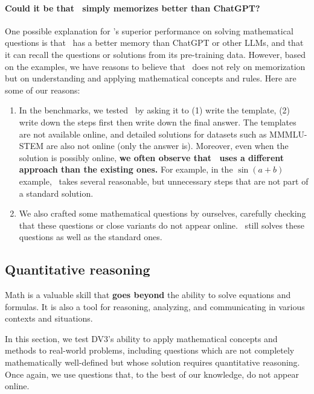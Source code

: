 \paragraph{Could it be that \DV \ simply memorizes better than ChatGPT?} One possible explanation for \DV's superior performance on solving mathematical questions is that \DV \ has a better memory than ChatGPT or other LLMs, and that it can recall the questions or solutions from its pre-training data. However, based on the examples, we have reasons to believe that \DV \ does not rely on memorization but on understanding and applying mathematical concepts and rules. Here are some of our reasons:
\begin{enumerate}
    \item In the benchmarks, we tested \DV \ by asking it to (1) write the template, (2) write down the steps first then write down the final answer. The templates are not available online, and detailed solutions for datasets such as MMMLU-STEM are also not online (only the answer is). Moreover, even when the solution is possibly online, \textbf{we often observe that \DV \ uses a different approach than the existing ones.} For example, in the $\sin(a + b)$ example, \DV \ takes several reasonable, but unnecessary steps that are not part of a standard solution.
    \item We also crafted some mathematical questions by ourselves, carefully checking that these questions or close variants do not appear online. \DV \ still solves these questions as well as the standard ones. 
\end{enumerate}

\subsection{Quantitative reasoning}

Math is a valuable skill that \textbf{goes beyond} the ability to solve equations and formulas. It is also a tool for reasoning, analyzing, and communicating in various contexts and situations. 

In this section, we test DV3's ability to apply mathematical concepts and methods to real-world problems, including questions which are not completely mathematically well-defined but whose solution requires quantitative reasoning. Once again, we use questions that, to the best of our knowledge, do not appear online.

